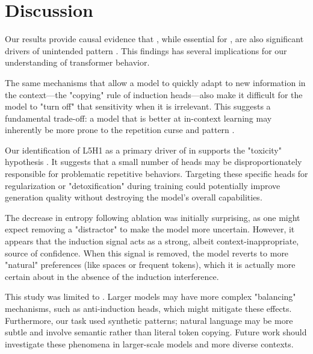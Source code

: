\section{Discussion}
\label{sec:discussion}

Our results provide causal evidence that \inductionheads, while essential for \icl, are also significant drivers of unintended pattern \leakage. This findings has several implications for our understanding of transformer behavior.

The same mechanisms that allow a model to quickly adapt to new information in the context—the "copying" rule of induction heads—also make it difficult for the model to "turn off" that sensitivity when it is irrelevant. This suggests a fundamental trade-off: a model that is better at in-context learning may inherently be more prone to the repetition curse and pattern \leakage.

Our identification of L5H1 as a primary driver of \leakage in \gpttwo supports the "toxicity" hypothesis \cite{wang2025induction}. It suggests that a small number of heads may be disproportionately responsible for problematic repetitive behaviors. Targeting these specific heads for regularization or "detoxification" during training could potentially improve generation quality without destroying the model's overall \icl capabilities.

The decrease in entropy following ablation was initially surprising, as one might expect removing a "distractor" to make the model more uncertain. However, it appears that the induction signal acts as a strong, albeit context-inappropriate, source of confidence. When this signal is removed, the model reverts to more "natural" preferences (like spaces or frequent tokens), which it is actually more certain about in the absence of the induction interference.

This study was limited to \gpttwo. Larger models may have more complex "balancing" mechanisms, such as anti-induction heads, which might mitigate these effects. Furthermore, our \taskname task used synthetic patterns; natural language \leakage may be more subtle and involve semantic rather than literal token copying. Future work should investigate these phenomena in larger-scale models and more diverse contexts.
